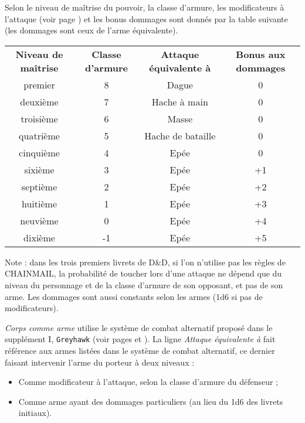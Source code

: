 \bigskip

Selon le niveau de maîtrise du pouvoir, la classe d'armure, les modificateurs à l'attaque (voir page \pageref{custom-combat-alternatif}) et les bonus dommages sont donnés par la table suivante (les dommages sont ceux de l'arme équivalente).

\bigskip

\begin{tabular}{cccc}
\textbf{Niveau de maîtrise} & \textbf{Classe d'armure} & \textbf{Attaque équivalente à} & \textbf{Bonus aux dommages}\\
premier     & 8  & Dague                & 0 \\
deuxième    & 7  & Hache à main         & 0 \\
troisième   & 6  & Masse                & 0 \\
quatrième   & 5  & Hache de bataille    & 0 \\
cinquième   & 4  & Epée                 & 0 \\
sixième     & 3  & Epée                 & +1 \\
septième    & 2  & Epée                 & +2 \\
huitième    & 1  & Epée                 & +3 \\
neuvième    & 0  & Epée                 & +4 \\
dixième     & -1 & Epée                 & +5 \\
\end{tabular}

\bigskip

Note : dans les trois premiers livrets de D\&D, si l'on n'utilise pas les règles de CHAINMAIL, la probabilité de toucher lors d'une attaque ne dépend que du niveau du personnage et de la classe d'armure de son opposant, et pas de son arme. Les dommages sont aussi constants selon les armes (1d6 si pas de modificateurs).

\bigskip

\textit{Corps comme arme} utilise le système de combat alternatif proposé dans le supplément I, \texttt{Greyhawk} (voir pages \pageref{ew-corps-comme-arme} et \pageref{custom-combat-alternatif}). La ligne \textit{Attaque équivalente à} fait référence aux armes listées dans le système de combat alternatif, ce dernier faisant intervenir l'arme du porteur à deux niveaux :

\bigskip

\begin{itemize}
\item Comme modificateur à l'attaque, selon la classe d'armure du défenseur ;
\item Comme arme ayant des dommages particuliers (au lieu du 1d6 des livrets initiaux).
\end{itemize}

